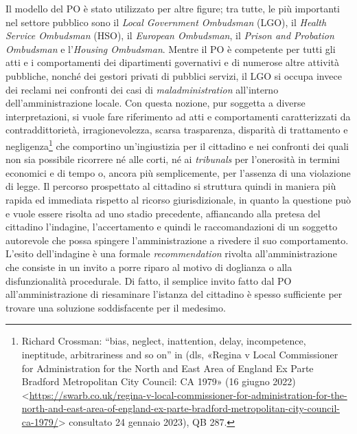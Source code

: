 \documentclass[12pt,it,a4paper,]{report}
\begin{document}
Il modello del PO è stato utilizzato per altre figure; tra tutte, le più
importanti nel settore pubblico sono il \emph{Local Government
Ombudsman} (LGO), il \emph{Health Service Ombudsman} (HSO), il
\emph{European Ombudsman}, il \emph{Prison and Probation Ombudsman} e
l'\emph{Housing Ombudsman}. Mentre il PO è competente per tutti gli atti
e i comportamenti dei dipartimenti governativi e di numerose altre
attività pubbliche, nonché dei gestori privati di pubblici servizi, il
LGO si occupa invece dei reclami nei confronti dei casi di
\emph{maladministration} all'interno dell'amministrazione locale. Con
questa nozione, pur soggetta a diverse interpretazioni, si vuole fare
riferimento ad atti e comportamenti caratterizzati da contraddittorietà,
irragionevolezza, scarsa trasparenza, disparità di trattamento e
negligenza\footnote{Richard Crossman: ``bias, neglect, inattention,
  delay, incompetence, ineptitude, arbitrariness and so on'' in (dls,
  {«Regina v {Local Commissioner} for {Administration} for the {North}
  and {East Area} of {England} Ex Parte {Bradford Metropolitan City
  Council}: {CA} 1979»} (16 giugno 2022)
  \textless{}\url{https://swarb.co.uk/regina-v-local-commissioner-for-administration-for-the-north-and-east-area-of-england-ex-parte-bradford-metropolitan-city-council-ca-1979/}\textgreater{}
  consultato 24 gennaio 2023), QB 287.} che comportino un'ingiustizia
per il cittadino e nei confronti dei quali non sia possibile ricorrere
né alle corti, né ai \emph{tribunals} per l'onerosità in termini
economici e di tempo o, ancora più semplicemente, per l'assenza di una
violazione di legge. Il percorso prospettato al cittadino si struttura
quindi in maniera più rapida ed immediata rispetto al ricorso
giurisdizionale, in quanto la questione può e vuole essere risolta ad
uno stadio precedente, affiancando alla pretesa del cittadino
l'indagine, l'accertamento e quindi le raccomandazioni di un soggetto
autorevole che possa spingere l'amministrazione a rivedere il suo
comportamento. L'esito dell'indagine è una formale \emph{recommendation}
rivolta all'amministrazione che consiste in un invito a porre riparo al
motivo di doglianza o alla disfunzionalità procedurale. Di fatto, il
semplice invito fatto dal PO all'amministrazione di riesaminare
l'istanza del cittadino è spesso sufficiente per trovare una soluzione
soddisfacente per il medesimo.
\end{document}
